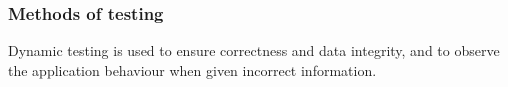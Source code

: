 \documentclass[12pt]{article}
\begin{document}

\subsubsection{Methods of testing}
Dynamic testing is used to ensure correctness and data integrity, and to observe the application behaviour when given incorrect information.
\end{document}
